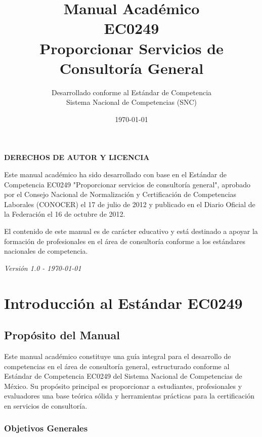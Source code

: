 \documentclass[12pt,letterpaper,oneside]{book}
\title{Manual Académico\\EC0249\\Proporcionar Servicios de Consultoría General}
\author{Desarrollado conforme al Estándar de Competencia\\Sistema Nacional de Competencias (SNC)}
\date{\today}
\begin{document}
\maketitle
\thispagestyle{empty}

\newpage
\thispagestyle{empty}
\vspace*{\fill}
\begin{center}
\textbf{DERECHOS DE AUTOR Y LICENCIA}

Este manual académico ha sido desarrollado con base en el Estándar de Competencia EC0249 "Proporcionar servicios de consultoría general", aprobado por el Consejo Nacional de Normalización y Certificación de Competencias Laborales (CONOCER) el 17 de julio de 2012 y publicado en el Diario Oficial de la Federación el 16 de octubre de 2012.

El contenido de este manual es de carácter educativo y está destinado a apoyar la formación de profesionales en el área de consultoría conforme a los estándares nacionales de competencia.

\vspace{1cm}

\textit{Versión 1.0 - \today}
\end{center}
\vspace*{\fill}

\tableofcontents
\newpage

\chapter{Introducción al Estándar EC0249}

\section{Propósito del Manual}

Este manual académico constituye una guía integral para el desarrollo de competencias en el área de consultoría general, estructurado conforme al Estándar de Competencia EC0249 del Sistema Nacional de Competencias de México. Su propósito principal es proporcionar a estudiantes, profesionales y evaluadores una base teórica sólida y herramientas prácticas para la certificación en servicios de consultoría.

\subsection{Objetivos Generales}
\end{document}
